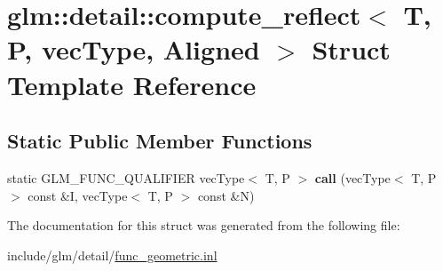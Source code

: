 \hypertarget{structglm_1_1detail_1_1compute__reflect}{}\section{glm\+:\+:detail\+:\+:compute\+\_\+reflect$<$ T, P, vec\+Type, Aligned $>$ Struct Template Reference}
\label{structglm_1_1detail_1_1compute__reflect}
\subsection*{Static Public Member Functions}
\begin{DoxyCompactItemize}
\item 
\mbox{\label{structglm_1_1detail_1_1compute__reflect_acab5e79e2afbcaead9bbc47776877e5a}} 
static G\+L\+M\+\_\+\+F\+U\+N\+C\+\_\+\+Q\+U\+A\+L\+I\+F\+I\+ER vec\+Type$<$ T, P $>$ {\bfseries call} (vec\+Type$<$ T, P $>$ const \&I, vec\+Type$<$ T, P $>$ const \&N)
\end{DoxyCompactItemize}


The documentation for this struct was generated from the following file\+:\begin{DoxyCompactItemize}
\item 
include/glm/detail/\hyperlink{func__geometric_8inl}{func\+\_\+geometric.\+inl}\end{DoxyCompactItemize}
